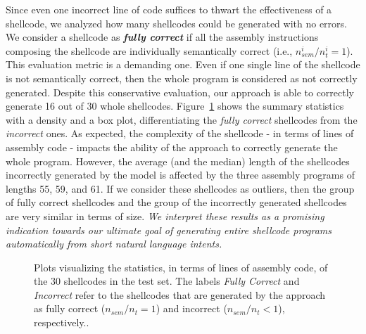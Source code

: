 Since even one incorrect line of code suffices to thwart the effectiveness of a shellcode, we analyzed how many shellcodes could be generated with no errors. We consider a shellcode as \textit{\textbf{fully correct}} if all the assembly instructions composing the shellcode are individually semantically correct (i.e., $n_{sem}^i/n_{t}^i = 1$).
This evaluation metric is a demanding one. Even if one single line of the shellcode is not semantically correct, then the whole program is considered as not correctly generated. Despite this conservative evaluation, our approach is able to correctly generate 16 out of 30 whole shellcodes. 
Figure~\ref{fig:shellcode_length} shows the summary statistics with a density and a box plot, differentiating the \textit{fully correct} shellcodes  from the \textit{incorrect} ones. As expected, the complexity of the shellcode - in terms of lines of assembly code - impacts the ability of the approach to correctly generate the whole program. 
However, the average (and the median) length of the shellcodes incorrectly generated by the model is affected by the three assembly programs of lengths 55, 59, and 61. If we consider these shellcodes as outliers, then the group of fully correct shellcodes and the group of the incorrectly generated shellcodes are very similar in terms of size.
\textit{We interpret these results as a promising indication towards our ultimate goal of generating entire shellcode programs automatically from short natural language intents.}



 \begin{figure}[ht]

    \centering
    
    \hfill
    \caption{Plots visualizing the statistics, in terms of lines of assembly code, of the  30 shellcodes in the test set. The labels \textit{Fully Correct} and \textit{Incorrect} refer to the shellcodes that are generated by the approach as fully correct ($n_{sem}/n_t = 1$) and incorrect ($n_{sem}/n_t < 1$), respectively..}
    \label{fig:shellcode_length}
     
\end{figure}

